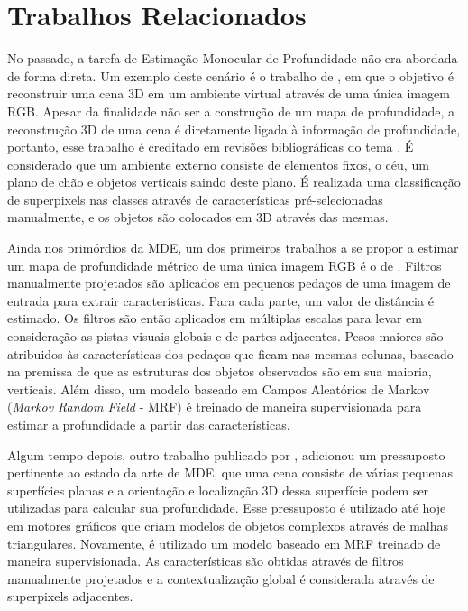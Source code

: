 \chapter{Trabalhos Relacionados}


No passado, a tarefa de Estimação Monocular de Profundidade não era abordada de forma direta. Um exemplo deste cenário é o trabalho de , em que o objetivo é reconstruir uma cena 3D em um ambiente virtual através de uma única imagem RGB. Apesar da finalidade não ser a construção de um mapa de profundidade, a reconstrução 3D de uma cena é diretamente ligada à informação de profundidade, portanto, esse trabalho é creditado em revisões bibliográficas do tema \cite{mertan2022single}. É considerado que um ambiente externo consiste de elementos fixos, o céu, um plano de chão e objetos verticais saindo deste plano. É realizada uma classificação de superpixels nas classes através de características pré-selecionadas manualmente, e os objetos são colocados em 3D através das mesmas.


Ainda nos primórdios da MDE, um dos primeiros trabalhos a se propor a estimar um mapa de profundidade métrico de uma única imagem RGB é o de . Filtros manualmente projetados são aplicados em pequenos pedaços de uma imagem de entrada para extrair características. Para cada parte, um valor de distância é estimado. Os filtros são então aplicados em múltiplas escalas para levar em consideração as pistas visuais globais e de partes adjacentes. Pesos maiores são atribuidos às características dos pedaços que ficam nas mesmas colunas, baseado na premissa de que as estruturas dos objetos observados são em sua maioria, verticais. Além disso, um modelo baseado em Campos Aleatórios de Markov (\textit{Markov Random Field} - MRF) é treinado de maneira supervisionada para estimar a profundidade a partir das características.


Algum tempo depois, outro trabalho publicado por , adicionou um pressuposto pertinente ao estado da arte de MDE, que uma cena consiste de várias pequenas superfícies planas e a orientação e localização 3D dessa superfície podem ser utilizadas para calcular sua profundidade. Esse pressuposto é utilizado até hoje em motores gráficos que criam modelos de objetos complexos através de malhas triangulares. Novamente, é utilizado um modelo baseado em MRF treinado de maneira supervisionada. As características são obtidas através de filtros manualmente projetados e a contextualização global é considerada através de superpixels adjacentes.


